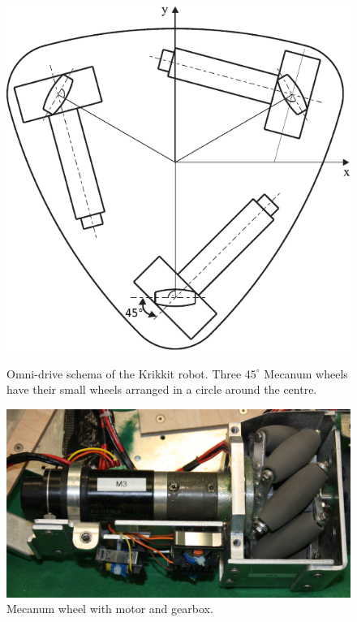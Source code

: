 \documentclass[12pt,a4paper]{article}
\begin{document}
\begin{figure}[hb]
  \begin{minipage}{0.45\textwidth}
   \centering
    \includegraphics[width=1\textwidth]{figures/krikkit_drive_angles}
    \caption{\label{fig:omnidrive}Omni-drive schema of the Krikkit robot. Three $45^\circ$ Mecanum wheels have their small wheels arranged in a circle around the centre.
    \cite{mecanum2007}}
  \end{minipage}\hfill
  \begin{minipage}{0.45\textwidth}
   \centering
    \includegraphics[width=1\textwidth]{figures/Omniwheel_drive.png}
    \caption{\label{fig:mec-wheel}Mecanum wheel with motor and gearbox.}
  \end{minipage}
\end{figure}
\end{document}
